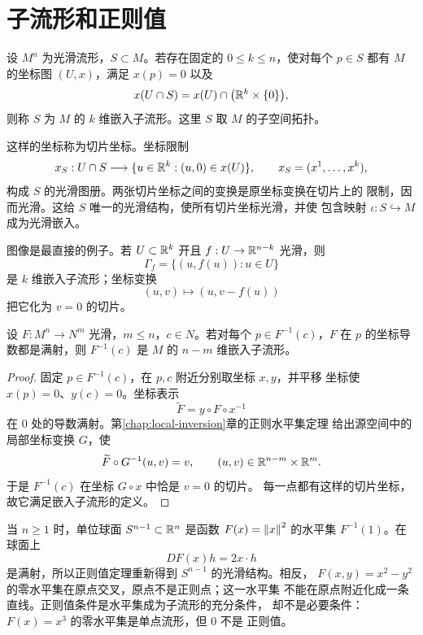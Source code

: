 \section{子流形和正则值}

\begin{definition}
设 \(M^n\) 为光滑流形，\(S\subset M\)。若存在固定的
\(0\le k\le n\)，使对每个 \(p\in S\) 都有 \(M\) 的坐标图
\((U,x)\)，满足 \(x(p)=0\) 以及
\[
 x(U\cap S)=x(U)\cap\bigl(\mathbb{R}^k\times\{0\}\bigr),
\]
则称 \(S\) 为 \(M\) 的 \(k\) 维嵌入子流形。这里 \(S\) 取 \(M\)
的子空间拓扑。
\end{definition}

这样的坐标称为切片坐标。坐标限制
\[
 x_S:U\cap S\longrightarrow
 \{u\in\mathbb{R}^k:(u,0)\in x(U)\},\qquad
 x_S=(x^1,\ldots,x^k),
\]
构成 \(S\) 的光滑图册。两张切片坐标之间的变换是原坐标变换在切片上的
限制，因而光滑。这给 \(S\) 唯一的光滑结构，使所有切片坐标光滑，并使
包含映射 \(\iota:S\hookrightarrow M\) 成为光滑嵌入。

图像是最直接的例子。若 \(U\subset\mathbb{R}^k\) 开且
\(f:U\to\mathbb{R}^{n-k}\) 光滑，则
\[
 \Gamma_f=\{(u,f(u)):u\in U\}
\]
是 \(k\) 维嵌入子流形；坐标变换
\[
 (u,v)\longmapsto (u,v-f(u))
\]
把它化为 \(v=0\) 的切片。

\begin{theorem}[正则值定理]\label{thm:regular-value-submanifold}
设 \(F:M^n\to N^m\) 光滑，\(m\le n\)，\(c\in N\)。若对每个
\(p\in F^{-1}(c)\)，\(F\) 在 \(p\) 的坐标导数都是满射，则
\(F^{-1}(c)\) 是 \(M\) 的 \(n-m\) 维嵌入子流形。
\end{theorem}

\begin{proof}
固定 \(p\in F^{-1}(c)\)，在 \(p,c\) 附近分别取坐标 \(x,y\)，并平移
坐标使 \(x(p)=0\)、\(y(c)=0\)。坐标表示
\[
 \widetilde F=y\circ F\circ x^{-1}
\]
在 \(0\) 处的导数满射。第\ref{chap:local-inversion}章的正则水平集定理
给出源空间中的局部坐标变换 \(G\)，使
\[
 \widetilde F\circ G^{-1}(u,v)=v,\qquad
 (u,v)\in\mathbb{R}^{n-m}\times\mathbb{R}^m.
\]
于是 \(F^{-1}(c)\) 在坐标 \(G\circ x\) 中恰是 \(v=0\) 的切片。
每一点都有这样的切片坐标，故它满足嵌入子流形的定义。
\end{proof}

当 $n\ge1$ 时，单位球面 $S^{n-1}\subset\mathbb{R}^n$ 是函数
\(F(x)=\left\lVert x\right\rVert^2\) 的水平集 \(F^{-1}(1)\)。在球面上
\[
 DF(x)h=2x\cdot h
\]
是满射，所以正则值定理重新得到 \(S^{n-1}\) 的光滑结构。相反，
\(F(x,y)=x^2-y^2\) 的零水平集在原点交叉，原点不是正则点；这一水平集
不能在原点附近化成一条直线。正则值条件是水平集成为子流形的充分条件，
却不是必要条件：\(F(x)=x^3\) 的零水平集是单点流形，但 \(0\) 不是
正则值。

